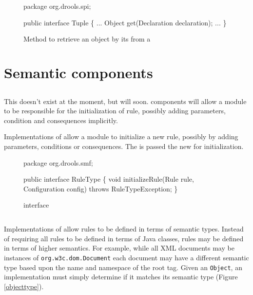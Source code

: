 \begin{figure}
\begin{javaCodelisting}
package org.drools.spi;

public interface Tuple
\{
    ...
    Object get(Declaration declaration);
    ...
\}
\end{javaCodelisting}
\caption{Method to retrieve an object by its 
 from a }
\label{smf.tuple}
\end{figure}



\section{Semantic components}

\subsection{}

\begin{implnote}
This doesn't exist at the moment, but will soon.  
components will allow a module to be responsible for the
initialization of rule, possibly adding parameters, condition and
consequences implicitly.
\end{implnote}

Implementations of  allow a module to initialize
a new rule, possibly by adding parameters, conditions or consequences.
The  is passed the new  for
initialization.

\begin{figure}
\begin{javaCodelisting}
package org.drools.smf;

public interface RuleType
\{
    void initializeRule(Rule rule,
                        Configuration config)
        throws RuleTypeException;
\}
\end{javaCodelisting}
\caption{ interface}
\label{ruletype}
\end{figure}

\subsection{}
\label{smf.objecttype}

Implementations of  allow rules to be
defined in terms of semantic types. Instead of requiring all
rules to be defined in terms of Java classes, rules may be
defined in terms of higher semantics.  For example, while
all XML documents may be instances of \texttt{org.w3c.dom.Document}
each document may have a different semantic type based upon
the name and namespace of the root tag.  Given an \texttt{Object},
an  implementation must simply determine
if it matches its semantic type (Figure \vref{objecttype}).

